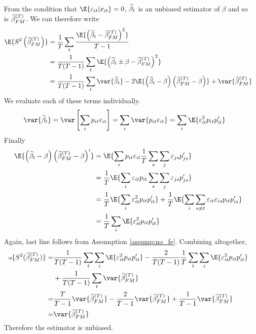 \begin{solution}
\begin{enumerate}[label = (\alph*)]
    From the condition that \(\E{\varepsilon_{it}\vert x_{it}} = 0\), \(\widehat{\beta}_t\) is an unbiased estimator of \(\beta\) and so is  \(\widehat{\beta}^{(T)}_{FM}\). We can therefore write
    \begin{equation}
        \begin{aligned}
            \label{eq:fm_variance}
        \E{S^2\bp{\wh\beta^{(T)}_{FM}}} & = \frac{1}{T} \sum_t \frac{\E{\bp{\wh\beta_t - \wh\beta^{(T)}_{FM}}^2}}{T-1} \\
        & = \frac{1}{T(T-1)} \sum_t \E{\bp{\wh\beta_t \pm \beta - \wh\beta^{ (T)}_{FM}}^2} \\ 
        & = \frac{1}{T(T-1)}\sum_t \var{\wh\beta_t} -  2\E{\bp{\wh\beta_t - \beta}\bp{\wh\beta^{(T)}_{FM}-\beta}} + \var{\wh\beta^{(T)}_{FM}}
        \end{aligned}
    \end{equation}
    We evaluate each of these terms individually.
    \begin{align*}
        \var{\wh\beta_t} & = \var\bs{\sum_i p_{it}\varepsilon_{it}} = \sum_i\var{p_{it}\varepsilon_{it}} = \sum_i\E{\varepsilon_{it}^2p_{it}p_{it}^\prime} 
    \end{align*}
    Finally
    \begin{align*}
        \E{\bp{\wh\beta_t-\beta}\bp{\wh\beta^{(T)}_{FM}-\beta}^\prime} & = \E{\sum_ip_{it}\varepsilon_{it}\frac{1}{T}\sum_s\sum_j\varepsilon_{js}p_{js}^\prime} \\
        & = \frac{1}{T}\E{\sum_i \varepsilon_{it}p_{it}\sum_s\sum_j\varepsilon_{js}p_{js}^\prime} \\
        & = \frac{1}{T}\E{\sum_i \varepsilon_{it}^2p_{it}p_{it}^\prime} + \frac{1}{T}\E{\sum_i\sum_{s \neq t}\varepsilon_{it}\varepsilon_{is}p_{it}p_{is}^\prime} \\
        & = \frac{1}{T}\sum_i\E{\varepsilon_{it}^2p_{it}p_{it}^\prime}
    \end{align*}
    Again, last line follows from Assumption \ref{assump:no_fe}. Combining altogether,
    \begin{align*}
        \tiny
        \E{S^2(\wh\beta^{(T)}_{FM})} = & \frac{1}{T(T-1)}\sum_t\sum_i\E{\varepsilon_{it}^2p_{it}p_{it}^\prime}  - \frac{2}{T(T-1)}\frac{1}{T}\sum_t\sum_i \E{\varepsilon_{it}^2p_{it}p_{it}^\prime} \\ & + \frac{1}{T(T-1)}\sum_t\var{\wh\beta^{(T)}_{FM}} \\ 
        = & \frac{T}{T-1}\var{\wh\beta^{(T)}_{FM}} - \frac{2}{T-1}\var{\wh\beta^{(T)}_{FM}} + \frac{1}{T-1}\var{\wh\beta^{(T)}_{FM}} \\
        = & \var{\wh\beta^{(T)}_{FM}}
    \end{align*}
    Therefore the estimator is unbiased.


\end{enumerate}
\end{solution}
